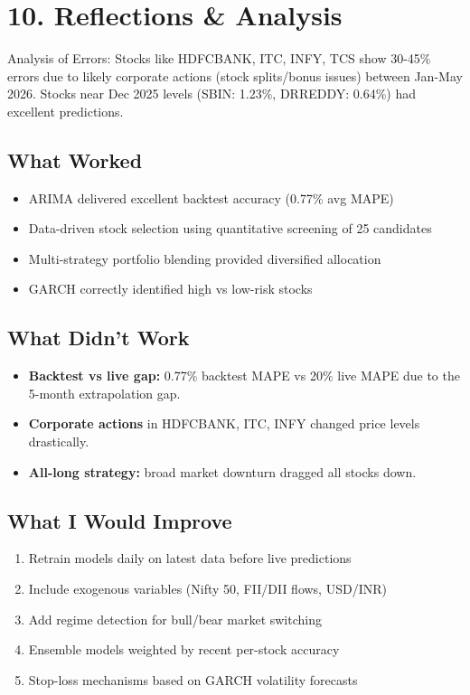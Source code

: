\documentclass[11pt,a4paper]{article}
\begin{document}
\section{10. Reflections \& Analysis}
Analysis of Errors: Stocks like HDFCBANK, ITC, INFY, TCS show 30-45\% errors due to likely corporate actions (stock splits/bonus issues) between Jan-May 2026. Stocks near Dec 2025 levels (SBIN: 1.23\%, DRREDDY: 0.64\%) had excellent predictions.

\subsection{What Worked}
\begin{itemize}[nosep]
\item ARIMA delivered excellent backtest accuracy (0.77\% avg MAPE)
\item Data-driven stock selection using quantitative screening of 25 candidates
\item Multi-strategy portfolio blending provided diversified allocation
\item GARCH correctly identified high vs low-risk stocks
\end{itemize}

\subsection{What Didn't Work}
\begin{itemize}[nosep]
\item \textbf{Backtest vs live gap:} 0.77\% backtest MAPE vs 20\% live MAPE due to the 5-month extrapolation gap.
\item \textbf{Corporate actions} in HDFCBANK, ITC, INFY changed price levels drastically.
\item \textbf{All-long strategy:} broad market downturn dragged all stocks down.
\end{itemize}

\subsection{What I Would Improve}
\begin{enumerate}[nosep]
\item Retrain models daily on latest data before live predictions
\item Include exogenous variables (Nifty 50, FII/DII flows, USD/INR)
\item Add regime detection for bull/bear market switching
\item Ensemble models weighted by recent per-stock accuracy
\item Stop-loss mechanisms based on GARCH volatility forecasts
\end{enumerate}
\end{document}
